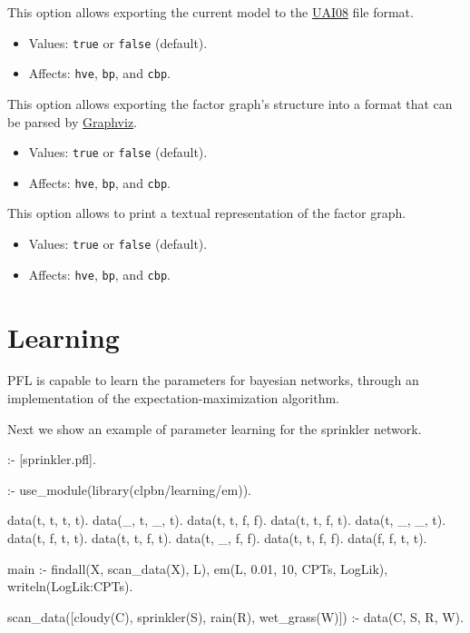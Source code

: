 \documentclass{article}
\begin{document}
This option allows exporting the current model to the \href{http://graphmod.ics.uci.edu/uai08/FileFormat}{UAI08} file format.
\begin{itemize}
  \item Values: \texttt{true} or \texttt{false} (default).
  \item Affects: \texttt{hve}, \texttt{bp}, and \texttt{cbp}.
\end{itemize}


This option allows exporting the factor graph's structure into a format that can be parsed by \href{http://www.graphviz.org/}{Graphviz}.
\begin{itemize}
  \item Values: \texttt{true} or \texttt{false} (default).
  \item Affects: \texttt{hve}, \texttt{bp}, and \texttt{cbp}.
\end{itemize}

This option allows to print a textual representation of the factor graph.
\begin{itemize}
  \item Values: \texttt{true} or \texttt{false} (default).
  \item Affects: \texttt{hve}, \texttt{bp}, and \texttt{cbp}.
\end{itemize}



\section{Learning}
PFL is capable to learn the parameters for bayesian networks, through an implementation of the expectation-maximization algorithm.

Next we show an example of parameter learning for the sprinkler network.

\begin{pflcode}
:- [sprinkler.pfl].

:- use_module(library(clpbn/learning/em)).

data(t, t, t, t).
data(_, t, _, t).
data(t, t, f, f).
data(t, t, f, t).
data(t, _, _, t).
data(t, f, t, t).
data(t, t, f, t).
data(t, _, f, f).
data(t, t, f, f).
data(f, f, t, t).

main :-
    findall(X, scan_data(X), L),
    em(L, 0.01, 10, CPTs, LogLik),
    writeln(LogLik:CPTs).

scan_data([cloudy(C), sprinkler(S), rain(R), wet_grass(W)]) :-
    data(C, S, R, W).
\end{pflcode}
\end{document}
